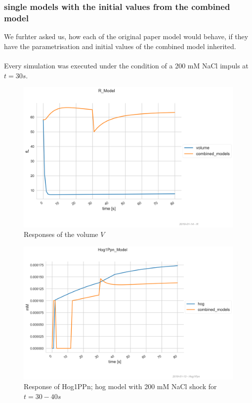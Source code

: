 \subsubsection{single models with the initial values from the combined model}
We furhter asked us, how each of the original paper model would behave, if they have the parametrisation and initial values of the combined model inherited.\\\\
Every simulation was executed under the condition of a 200 mM NaCl impuls at $t=30s$.\\
\begin{figure}[h!]
	\begin{center}
		\begin{minipage}{0,8\textwidth}
			
			\includegraphics[width=\textwidth]{picture/r_71.png}
			\caption{Responses of the volume $V$} 
			\label{CombiInitVolume} 
		\end{minipage}
	\end{center}
\end{figure}
\begin{figure}[h!]
	\begin{center}
		\begin{minipage}{0,8\textwidth}
			
			\includegraphics[width=\textwidth]{picture/Hog1PPn_71.png}
			\caption{Response of Hog1PPn; hog model with 200 mM NaCl shock for $t=30-40s$} 
			\label{CombiInitHog} 
		\end{minipage}
	\end{center}
\end{figure}
